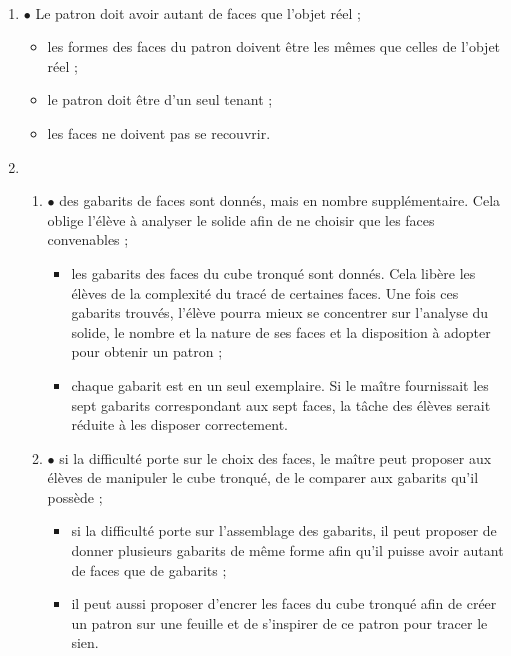 \ \\ [-5mm]
\begin{enumerate}
   \item \textcolor{A2}{$\bullet$} Le patron doit avoir autant de faces que l’objet réel ;
   \begin{itemize}
      \item les formes des faces du patron doivent être les mêmes que celles de l’objet réel ;
      \item le patron doit être d'un seul tenant ;
      \item les faces ne doivent pas se recouvrir. \\
   \end{itemize}
   \item
   \begin{enumerate}
      \item \textcolor{A2}{$\bullet$} des gabarits de faces sont donnés, mais en nombre supplémentaire. Cela oblige l'élève à analyser le solide afin de ne choisir que les faces convenables ;
      \begin{itemize}
         \item les gabarits des faces du cube tronqué sont donnés. Cela libère les élèves de la complexité du tracé de certaines faces. Une fois ces gabarits trouvés, l'élève pourra mieux se concentrer sur l’analyse du solide, le nombre et la nature de ses faces et la disposition à adopter pour obtenir un patron ;
         \item chaque gabarit est en un seul exemplaire. Si le maître fournissait les sept gabarits correspondant aux sept faces, la tâche des élèves serait réduite à les disposer correctement. \\
      \end{itemize}
      \item \textcolor{A2}{$\bullet$} si la difficulté porte sur le choix des faces, le maître peut proposer aux élèves de manipuler le cube tronqué, de le comparer aux gabarits qu'il possède ;
      \begin{itemize}
         \item si la difficulté porte sur l'assemblage des gabarits, il peut proposer de donner plusieurs gabarits de même forme afin qu'il puisse avoir autant de faces que de gabarits ;
         \item il peut aussi proposer d'encrer les faces du cube tronqué afin de créer un patron sur une feuille et de s'inspirer de ce patron pour tracer le sien. \\
      \end{itemize}

\end{enumerate}
\end{enumerate}
